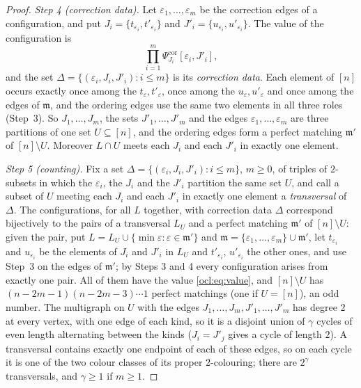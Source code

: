 \documentclass[11pt]{amsart}
\theoremstyle{definition}
\theoremstyle{remark}
\numberwithin{equation}{section}
\theoremstyle{plain}
\theoremstyle{definition}
\theoremstyle{plain}
\begin{document}
\begin{proof}
\emph{Step 4 (correction data).} Let $\varepsilon_1,\dots,\varepsilon_m$ be the correction edges of a configuration, and
put $J_i=\{t_{\varepsilon_i},t'_{\varepsilon_i}\}$ and $J'_i=\{u_{\varepsilon_i},u'_{\varepsilon_i}\}$. The value of the
configuration is
\begin{equation}\label{ocl:eq:value}
\prod_{i=1}^m\Psi^{\mathrm{cor}}_{J_i}[\varepsilon_i,J'_i],
\end{equation}
and the set $\Delta=\{(\varepsilon_i,J_i,J'_i):i\le m\}$ is its \emph{correction data}. Each element of $[n]$ occurs
exactly once among the $t_\varepsilon,t'_\varepsilon$, once among the $u_\varepsilon,u'_\varepsilon$ and once among the
edges of $\mathfrak m$, and the ordering edges use the same two elements in all three roles (Step~3). So
$J_1,\dots,J_m$, the sets $J'_1,\dots,J'_m$ and the edges $\varepsilon_1,\dots,\varepsilon_m$ are three partitions of one
set $U\subseteq[n]$, and the ordering edges form a perfect matching $\mathfrak m'$ of $[n]\setminus U$. Moreover
$L\cap U$ meets each $J_i$ and each $J'_i$ in exactly one element.

\emph{Step 5 (counting).} Fix a set $\Delta=\{(\varepsilon_i,J_i,J'_i):i\le m\}$, $m\ge0$, of triples of $2$-subsets in
which the $\varepsilon_i$, the $J_i$ and the $J'_i$ partition the same set $U$, and call a subset of $U$ meeting each
$J_i$ and each $J'_i$ in exactly one element a \emph{transversal} of $\Delta$. The configurations, for all $L$
together, with correction data $\Delta$ correspond bijectively to the pairs of a transversal $L_U$ and a perfect
matching $\mathfrak m'$ of $[n]\setminus U$: given the pair, put $L=L_U\cup\{\min\varepsilon:\varepsilon\in\mathfrak m'\}$
and $\mathfrak m=\{\varepsilon_1,\dots,\varepsilon_m\}\cup\mathfrak m'$, let $t_{\varepsilon_i}$ and $u_{\varepsilon_i}$
be the elements of $J_i$ and $J'_i$ in $L_U$ and $t'_{\varepsilon_i}$, $u'_{\varepsilon_i}$ the other ones, and use
Step~3 on the edges of $\mathfrak m'$; by Steps 3 and 4 every configuration arises from exactly one pair. All of them
have the value \eqref{ocl:eq:value}, and $[n]\setminus U$ has $(n-2m-1)(n-2m-3)\cdots1$ perfect matchings (one if
$U=[n]$), an odd number. The multigraph on $U$ with the edges $J_1,\dots,J_m,J'_1,\dots,J'_m$ has degree $2$ at every
vertex, with one edge of each kind, so it is a disjoint union of $\gamma$ cycles of even length alternating between the
kinds ($J_i=J'_j$ gives a cycle of length $2$). A transversal contains exactly one endpoint of each of these edges, so
on each cycle it is one of the two colour classes of its proper $2$-colouring; there are $2^\gamma$ transversals, and
$\gamma\ge1$ if $m\ge1$.


\end{proof}
\end{document}
